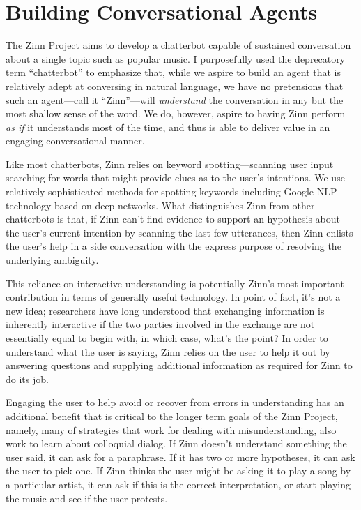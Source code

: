 \documentclass[letterpaper,11pt]{article}
\begin{document}
\section*{Building Conversational Agents}

The Zinn Project aims to develop a chatterbot capable of sustained conversation about a single topic such as popular music. I purposefully used the deprecatory term ``chatterbot'' to emphasize that, while we aspire to build an agent that is relatively adept at conversing in natural language, we have no pretensions that such an agent---call it ``Zinn''---will {\it{understand}} the conversation in any but the most shallow sense of the word. We do, however, aspire to having Zinn perform {\it{as if}} it understands most of the time, and thus is able to deliver value in an engaging conversational manner. 

Like most chatterbots, Zinn relies on keyword spotting---scanning user input searching for words that might provide clues as to the user's intentions.  We use relatively sophisticated methods for spotting keywords including Google NLP technology based on deep networks.  What distinguishes Zinn from other chatterbots is that, if Zinn can't find evidence to support an hypothesis about the user's current intention by scanning the last few utterances, then Zinn enlists the user's help in a side conversation with the express purpose of resolving the underlying ambiguity. 

This reliance on interactive understanding is potentially Zinn's most important contribution in terms of generally useful technology.  In point of fact, it's not a new idea; researchers have long understood that exchanging information is inherently interactive if the two parties involved in the exchange are not essentially equal to begin with, in which case, what's the point?  In order to understand what the user is saying, Zinn relies on the user to help it out by answering questions and supplying additional information as required for Zinn to do its job.  

Engaging the user to help avoid or recover from errors in understanding has an additional benefit that is critical to the longer term goals of the Zinn Project, namely, many of strategies that work for dealing with misunderstanding, also work to learn about colloquial dialog. If Zinn doesn't understand something the user said, it can ask for a paraphrase. If it has two or more hypotheses, it can ask the user to pick one. If Zinn thinks the user might be asking it to play a song by a particular artist, it can ask if this is the correct interpretation, or start playing the music and see if the user protests.
\end{document}

